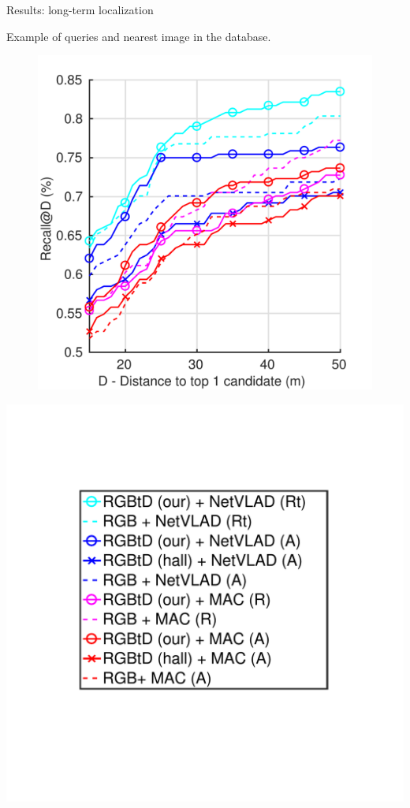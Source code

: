 \begin{frame}{Results: long-term localization}
\begin{minipage}{0.27\linewidth}
			{\scriptsize Example of queries and nearest image in the database.}
	\end{minipage}\hfill
	\begin{minipage}{0.49\linewidth}
		\centering
		\begin{figure}
			\includegraphics[width=0.9\linewidth]{vect/res/lt}
		\end{figure}
	\end{minipage}\hfill
	\begin{minipage}{0.2\linewidth}
			\includegraphics[trim={90 140 95 100},clip,width=\linewidth]{vect/res/legend}	

\end{minipage}
\end{frame}
